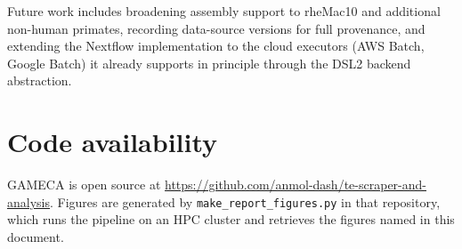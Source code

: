 \documentclass[11pt]{article}
\begin{document}
Future work includes broadening assembly support to rheMac10 and additional non-human
primates, recording data-source versions for full provenance, and extending the Nextflow
implementation to the cloud executors (AWS Batch, Google Batch) it already supports in
principle through the DSL2 backend abstraction.

\section*{Code availability}
GAMECA is open source at \url{https://github.com/anmol-dash/te-scraper-and-analysis}.
Figures are generated by \texttt{make\_report\_figures.py} in that repository, which runs the
pipeline on an HPC cluster and retrieves the figures named in this document.



\end{document}
